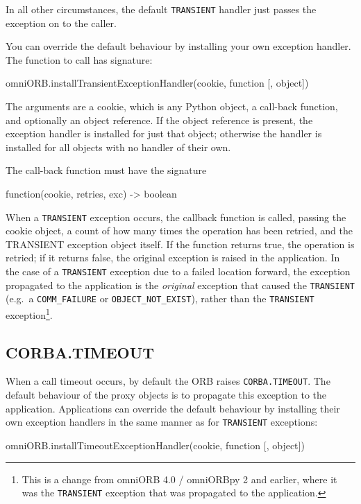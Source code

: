 \documentclass[11pt,oneside,a4paper]{book}
\newcommand{\code}[1]{\texttt{#1}}
\begin{document}
In all other circumstances, the default \code{TRANSIENT} handler just
passes the exception on to the caller.

You can override the default behaviour by installing your own
exception handler. The function to call has signature:

\begin{pylisting}
omniORB.installTransientExceptionHandler(cookie, function [, object])
\end{pylisting}

The arguments are a cookie, which is any Python object, a call-back
function, and optionally an object reference. If the object reference
is present, the exception handler is installed for just that object;
otherwise the handler is installed for all objects with no handler of
their own.

The call-back function must have the signature

\begin{pylisting}
function(cookie, retries, exc) -> boolean
\end{pylisting}

When a \code{TRANSIENT} exception occurs, the callback function is
called, passing the cookie object, a count of how many times the
operation has been retried, and the TRANSIENT exception object
itself. If the function returns true, the operation is retried; if it
returns false, the original exception is raised in the application. In
the case of a \code{TRANSIENT} exception due to a failed location
forward, the exception propagated to the application is the
\emph{original} exception that caused the \code{TRANSIENT} (e.g.\ a
\code{COMM\_FAILURE} or \code{OBJECT\_NOT\_EXIST}), rather than the
\code{TRANSIENT} exception\footnote{This is a change from omniORB 4.0
  / omniORBpy 2 and earlier, where it was the \code{TRANSIENT}
  exception that was propagated to the application.}.


\subsection{CORBA.TIMEOUT}

When a call timeout occurs, by default the ORB raises
\code{CORBA.TIMEOUT}. The default behaviour of the proxy objects is
to propagate this exception to the application. Applications can
override the default behaviour by installing their own exception
handlers in the same manner as for \code{TRANSIENT} exceptions:

\begin{pylisting}
omniORB.installTimeoutExceptionHandler(cookie, function [, object])
\end{pylisting}
\end{document}
